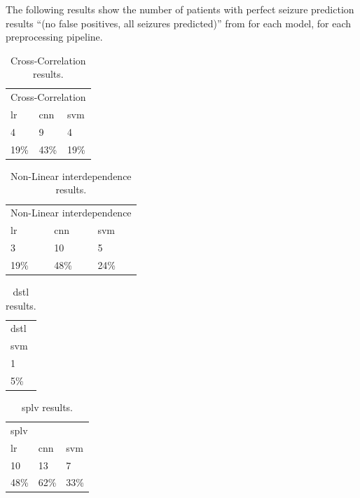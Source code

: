 \documentclass[12pt]{article}
\begin{document}
The following results show the number of patients with perfect seizure prediction results ``(no false positives, all seizures predicted)'' from \cite{mirowski2009classification} for each model, for each preprocessing pipeline.

\begin{table}[H]
\centering
\begin{tabular}{lll}
\multicolumn{3}{l}{Cross-Correlation} \\
\acrshort{lr}          & \acrshort{cnn}        & \acrshort{svm}        \\
4           & 9          & 4          \\
19\%        & 43\%       & 19\%      
\end{tabular}
\caption{Cross-Correlation results.}
\end{table}

\begin{table}[H]
\centering
\begin{tabular}{lll}
\multicolumn{3}{l}{Non-Linear interdependence} \\
\acrshort{lr}          & \acrshort{cnn}        & \acrshort{svm}        \\
3              & 10            & 5             \\
19\%           & 48\%          & 24\%         
\end{tabular}
\caption{Non-Linear interdependence results.}
\end{table}

\begin{table}[H]
\centering
\begin{tabular}{l}
\acrshort{dstl} \\
\acrshort{svm}  \\
1    \\
5\% 
\end{tabular}
\caption{\acrfull{dstl} results.}
\end{table}


\begin{table}[H]
\centering
\begin{tabular}{lll}
\multicolumn{3}{l}{\acrshort{splv}} \\
\acrshort{lr}          & \acrshort{cnn}        & \acrshort{svm}        \\
10     & 13     & 7      \\
48\%   & 62\%   & 33\%  
\end{tabular}
\caption{\acrfull{splv} results.}
\end{table}
\end{document}
